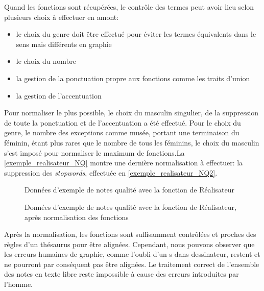Quand les fonctions sont récupérées, le contrôle des termes peut avoir lieu selon plusieurs choix à effectuer en amont:
\begin{itemize}
	\item le choix du genre doit être effectué pour éviter les termes équivalents dans le sens mais différents en graphie
	\item le choix du nombre
	\item la gestion de la ponctuation propre aux fonctions comme les traits d'union
	\item la gestion de l'accentuation
\end{itemize}
Pour normaliser le plus possible, le choix du masculin singulier, de la suppression de toute la ponctuation et de l'accentuation a été effectué. Pour le choix du genre, le nombre des exceptions comme \og musée\fg{}, portant une terminaison du féminin, étant plus rares que le nombre de tous les féminins, le choix du masculin s'est imposé pour normaliser le maximum de fonctions.La \autoref{exemple_realisateur_NQ} montre une dernière normalisation à effectuer: la suppression des \textit{stopwords}, effectuée en \autoref{exemple_realisateur_NQ2}.
\begin{figure}[!h]
	\centering
	\caption{Données d'exemple de notes qualité avec la fonction de Réalisateur}
	\label{exemple_realisateur_NQ}
\end{figure}
\begin{figure}[!h]
	\centering
	\caption{Données d'exemple de notes qualité avec la fonction de Réalisateur, après normalisation des fonctions}
	\label{exemple_realisateur_NQ2}
\end{figure}
\bigskip

Après la normalisation, les fonctions sont suffisamment contrôlées et proches des règles d'un thésaurus pour être alignées. Cependant, nous pouvons observer que les erreurs humaines de graphie, comme l'oubli d'un \og s\fg{} dans \og dessinateur\fg{}, restent et ne pourront par conséquent pas être alignées. Le traitement correct de l'ensemble des notes en texte libre reste impossible à cause des erreurs introduites par l'homme.\\

